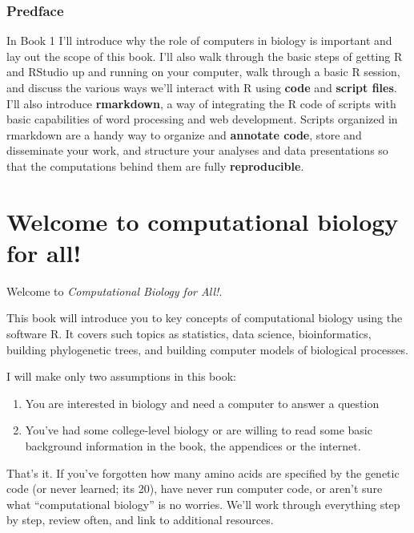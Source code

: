 \documentclass[
]{book}
\providecommand{\tightlist}{%
  \setlength{\itemsep}{0pt}\setlength{\parskip}{0pt}}
\begin{document}
\hypertarget{predface}{%
\subsection*{Predface}\label{predface}}

In Book 1 I'll introduce why the role of computers in biology is important and lay out the scope of this book. I'll also walk through the basic steps of getting R and RStudio up and running on your computer, walk through a basic R session, and discuss the various ways we'll interact with R using \textbf{code} and \textbf{script files}. I'll also introduce \textbf{rmarkdown}, a way of integrating the R code of scripts with basic capabilities of word processing and web development. Scripts organized in rmarkdown are a handy way to organize and \textbf{annotate code}, store and disseminate your work, and structure your analyses and data presentations so that the computations behind them are fully \textbf{reproducible}.

\hypertarget{intro}{%
\chapter{Welcome to computational biology for all!}\label{intro}}

Welcome to \emph{Computational Biology for All!}.

This book will introduce you to key concepts of computational biology using the software R. It covers such topics as statistics, data science, bioinformatics, building phylogenetic trees, and building computer models of biological processes.

I will make only two assumptions in this book:

\begin{enumerate}
\def\labelenumi{\arabic{enumi}.}
\tightlist
\item
  You are interested in biology and need a computer to answer a question
\item
  You've had some college-level biology or are willing to read some basic background information in the book, the appendices or the internet.
\end{enumerate}

That's it. If you've forgotten how many amino acids are specified by the genetic code (or never learned; its 20), have never run computer code, or aren't sure what ``computational biology'' is no worries. We'll work through everything step by step, review often, and link to additional resources.
\end{document}

